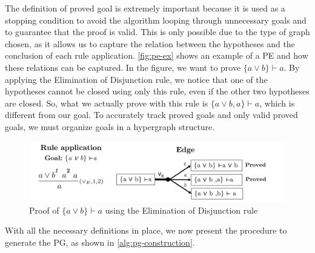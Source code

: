 The definition of proved goal is extremely important because it is used as a stopping condition to avoid the algorithm looping through unnecessary goals and to guarantee that the proof is valid. This is only possible due to the type of graph chosen, as it allows us to capture the relation between the hypotheses and the conclusion of each rule application. \autoref{fig:pe-ex} shows an example of a PE and how these relations can be captured. In the figure, we want to prove \(\{a \vee b\} \vdash a\). By applying the Elimination of Disjunction rule, we notice that one of the hypotheses cannot be closed using only this rule, even if the other two hypotheses are closed. So, what we actually prove with this rule is \(\{a \vee b, a\} \vdash a\), which is different from our goal. To accurately track proved goals and only valid proved goals, we must organize goals in a hypergraph structure.

\begin{figure}[h]
    \centering
    \includegraphics[width=1\linewidth]{resources/pe-example.jpg}
    \caption{Proof of \(\{a \vee b\} \vdash a\) using the Elimination of Disjunction rule}
    \label{fig:pe-ex}
\end{figure}

\vspace{1em}
With all the necessary definitions in place, we now present the procedure to generate the PG, as shown in \autoref{alg:pg-construction}.

